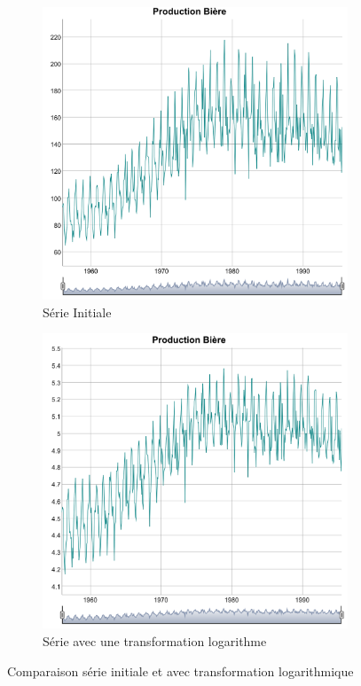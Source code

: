 \documentclass[12pt,a4paper]{book}
\newcommand{\1}{\mathds{1}}
\begin{document}
\begin{figure}[h]
	\begin{subfigure}{.5\textwidth}
  		\centering
    	\includegraphics[scale=0.4]{plot_beer}  
    	\caption{Série Initiale}
    	\label{fig:sub1}
    \end{subfigure}
    \begin{subfigure}{.5\textwidth}
    	\centering
    	\includegraphics[scale=0.3]{Log_Series}  
    	\caption{Série avec une transformation logarithme}
    	\label{fig:sub2}
    \end{subfigure}

\caption{Comparaison série initiale et avec transformation logarithmique}
\label{fig:test}
   
\end{figure}
\end{document}
